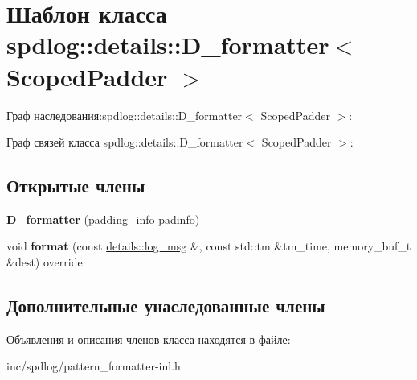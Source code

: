 \hypertarget{classspdlog_1_1details_1_1D__formatter}{}\section{Шаблон класса spdlog\+:\+:details\+:\+:D\+\_\+formatter$<$ Scoped\+Padder $>$}
\label{classspdlog_1_1details_1_1D__formatter}


Граф наследования\+:spdlog\+:\+:details\+:\+:D\+\_\+formatter$<$ Scoped\+Padder $>$\+:


Граф связей класса spdlog\+:\+:details\+:\+:D\+\_\+formatter$<$ Scoped\+Padder $>$\+:
\subsection*{Открытые члены}
\begin{DoxyCompactItemize}
\item 
\mbox{\label{classspdlog_1_1details_1_1D__formatter_a7ef81810724512ddca71f77634c17807}} 
{\bfseries D\+\_\+formatter} (\hyperlink{structspdlog_1_1details_1_1padding__info}{padding\+\_\+info} padinfo)
\item 
\mbox{\label{classspdlog_1_1details_1_1D__formatter_a95d0c29b6e6865d8bb9244d93baac193}} 
void {\bfseries format} (const \hyperlink{structspdlog_1_1details_1_1log__msg}{details\+::log\+\_\+msg} \&, const std\+::tm \&tm\+\_\+time, memory\+\_\+buf\+\_\+t \&dest) override
\end{DoxyCompactItemize}
\subsection*{Дополнительные унаследованные члены}


Объявления и описания членов класса находятся в файле\+:\begin{DoxyCompactItemize}
\item 
inc/spdlog/pattern\+\_\+formatter-\/inl.\+h\end{DoxyCompactItemize}
